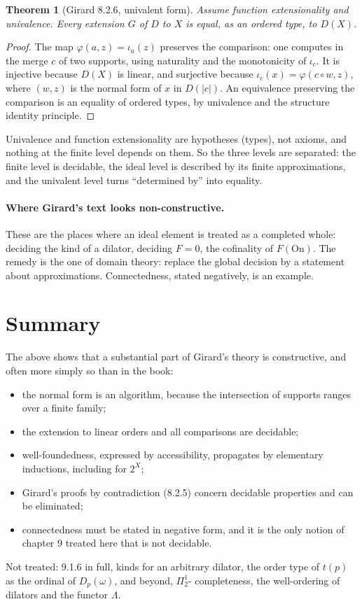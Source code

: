 \documentclass[11pt,a4paper]{article}
\newtheorem{theorem}{Theorem}[section]
\theoremstyle{definition}
\theoremstyle{remark}
\begin{document}
\begin{theorem}[Girard 8.2.6, univalent form]\label{th:uniq}
Assume function extensionality and univalence. Every extension $G$ of $D$
to $X$ is equal, as an ordered type, to $D(X)$.
\end{theorem}

\begin{proof}
The map $\varphi(a, z) = \iota_a(z)$ preserves the comparison: one
computes in the merge $c$ of two supports, using naturality and the
monotonicity of $\iota_c$. It is injective because $D(X)$ is linear, and
surjective because $\iota_c(x) = \varphi(c \circ w, z)$, where $(w, z)$ is
the normal form of $x$ in $D(|c|)$. An equivalence preserving the
comparison is an equality of ordered types, by univalence and the
structure identity principle.
\end{proof}

Univalence and function extensionality are hypotheses (types), not
axioms, and nothing at the finite level depends on them. So the three
levels are separated: the finite level is decidable, the ideal level is
described by its finite approximations, and the univalent level turns
``determined by'' into equality.

\paragraph{Where Girard's text looks non-constructive.}
These are the places where an ideal element is treated as a completed
whole: deciding the kind of a dilator, deciding $F = 0$, the cofinality of
$F(\mathrm{On})$. The remedy is the one of domain theory: replace the
global decision by a statement about approximations. Connectedness,
stated negatively, is an example.

\section{Summary}

The above shows that a substantial part of Girard's theory is
constructive, and often more simply so than in the book:
\begin{itemize}
\item the normal form is an algorithm, because the intersection of
  supports ranges over a finite family;
\item the extension to linear orders and all comparisons are decidable;
\item well-foundedness, expressed by accessibility, propagates by
  elementary inductions, including for $2^X$;
\item Girard's proofs by contradiction (8.2.5) concern decidable
  properties and can be eliminated;
\item connectedness must be stated in negative form, and it is the only
  notion of chapter 9 treated here that is not decidable.
\end{itemize}
Not treated: 9.1.6 in full, kinds for an arbitrary dilator, the order type
of $t(p)$ as the ordinal of $D_p(\omega)$, and beyond, $\Pi^1_2$-
completeness, the well-ordering of dilators and the functor $\Lambda$.
\end{document}
